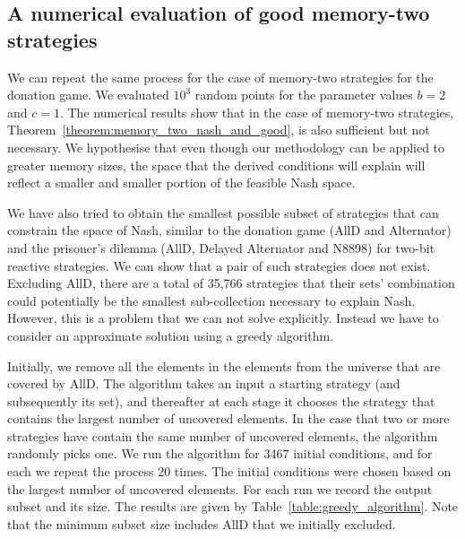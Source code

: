\documentclass{article}
\theoremstyle{definition}
\begin{document}
\subsection{A numerical evaluation of good memory-two strategies}\label{section:good_strategies_numerically_mem_two}

We can repeat the same process for the case of memory-two strategies for the
donation game. We evaluated \(10^3\) random points for the parameter values \(b=2\)
and \(c=1\). The numerical results show that in the case of memory-two strategies,
Theorem~\ref{theorem:memory_two_nash_and_good}, is also sufficient but not
necessary. We hypothesise that even though our methodology can be applied to
greater memory sizes, the space that the derived conditions will explain will
reflect a smaller and smaller portion of the feasible Nash space.

We have also tried to obtain the smallest possible subset of strategies that can
constrain the space of Nash, similar to the donation game (AllD and Alternator)
and the prisoner's dilemma (AllD, Delayed Alternator and N8898) for two-bit
reactive strategies. We can show that a pair of such strategies does not exist.
Excluding AllD, there are a total of 35,766 strategies that their sets'
combination could potentially  be the smallest sub-collection necessary to
explain Nash. However, this is a problem that we can not solve explicitly.
Instead we have to consider an approximate solution using a greedy algorithm.

Initially, we remove all the elements in the elements from the universe that are
covered by AllD. The algorithm takes an input a starting strategy (and
subsequently its set), and thereafter at each stage it chooses the strategy that
contains the largest number of uncovered elements. In the case that two or more
strategies have contain the same number of uncovered elements, the algorithm
randomly picks one. We run the algorithm for 3467 initial conditions, and for
each we repeat the process 20 times. The initial conditions were chosen based on
the largest number of uncovered elements. For each run we record the output
subset and its size. The results are given by
Table~\ref{table:greedy_algorithm}. Note that the minimum subset size includes
AllD that we initially excluded.
\end{document}
